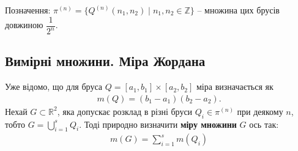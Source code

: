 \documentclass[a4paper, 10pt]{article}
\theoremstyle{theoremdd}
\theoremstyle{theoremdd}
\theoremstyle{theoremdd}
\theoremstyle{theoremdd}
\theoremstyle{theoremdd}
\theoremstyle{theoremdd}
\theoremstyle{theoremdd}
\theoremstyle{theoremdd}
\begin{document}
Позначення: $\pi^{(n)} = \{ Q^{(n)}(n_1,n_2) \mid n_1,n_2 \in \mathbb{Z}\}$ -- множина цих брусів довжиною $\dfrac{1}{2^n}$.

\subsection{Вимірні множини. Міра Жордана}
Уже відомо, що для бруса $Q = [a_1,b_1] \times [a_2,b_2]$ міра визначається як
\begin{align*} 
m(Q) = (b_1-a_1)(b_2-a_2).
\end{align*}
Нехай $G \subset \mathbb{R}^2$, яка допускає розклад в різні бруси $Q_i \in \pi^{(n)}$ при деякому $n$, тобто $G = \displaystyle\bigcup_{i=1}^s Q_i$. Тоді природно визначити \textbf{міру множини} $G$ ось так:
\begin{align*}
m(G) = \sum_{i=1}^s m(Q_i)
\end{align*}
\end{document}
